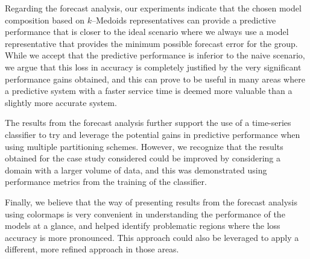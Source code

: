 Regarding the forecast analysis, our experiments indicate that the chosen model composition based on $k$--Medoids representatives can provide a predictive performance that is closer to the ideal scenario where we always use a model representative that provides the minimum possible forecast error for the group. While we accept that the predictive performance is inferior to the naive scenario, we argue that this loss in accuracy is completely justified by the very significant performance gains obtained, and this can prove to be useful in many areas where a predictive system with a faster service time is deemed more valuable than a slightly more accurate system.

The results from the forecast analysis further support the use of a time-series classifier to try and leverage the potential gains in predictive performance when using multiple partitioning schemes. However, we recognize that the results obtained for the case study considered could be improved by considering a domain with a larger volume of data, and this was demonstrated using performance metrics from the training of the classifier.

Finally, we believe that the way of presenting results from the forecast analysis using colormaps is very convenient in understanding the performance of the models at a glance, and helped identify problematic regions where the loss accuracy is more pronounced. This approach could also be leveraged to apply a different, more refined approach in those areas.